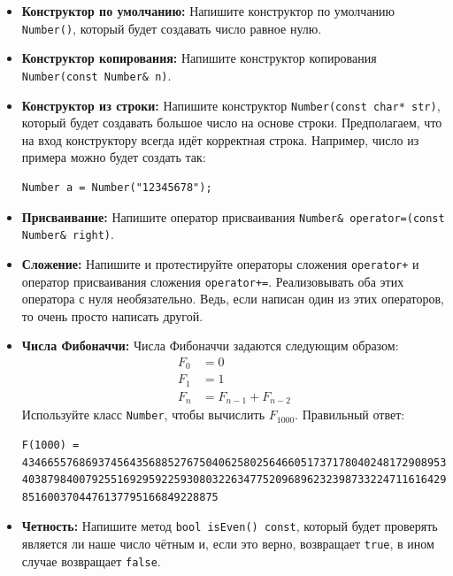 \documentclass{article}
\begin{document}
\begin{itemize}
\item \textbf{Конструктор по умолчанию:} Напишите конструктор по умолчанию \texttt{Number()}, который будет создавать число равное нулю.
\item \textbf{Конструктор копирования:} Напишите конструктор копирования \texttt{Number(const Number\& n)}.
\item \textbf{Конструктор из строки:} Напишите конструктор \texttt{Number(const char* str)}, который будет создавать большое число на основе строки. Предполагаем, что на вход конструктору всегда идёт корректная строка. Например, число из примера можно будет создать так:
\begin{lstlisting}
Number a = Number("12345678");
\end{lstlisting}
\item \textbf{Присваивание:} Напишите оператор присваивания \texttt{Number\& operator=(const Number\& right)}.
\item \textbf{Сложение:} Напишите и протестируйте операторы сложения \texttt{operator+} и оператор присваивания сложения \texttt{operator+=}.  Реализовывать оба этих оператора с нуля необязательно. Ведь, если написан один из этих операторов, то очень просто написать другой.
\item \textbf{Числа Фибоначчи:} Числа Фибоначчи задаются следующим образом:
\begin{align*}
F_0 &= 0\\
F_1 &= 1\\
F_n &= F_{n-1} + F_{n-2}
\end{align*}
Используйте класс \texttt{Number}, чтобы вычислить $F_{1000}$. Правильный ответ:
\begin{verbatim}
F(1000) = 43466557686937456435688527675040625802564660517371780402481729089536555417949051890
40387984007925516929592259308032263477520968962323987332247116164299644090653318793829896964992
8516003704476137795166849228875
\end{verbatim}




\item \textbf{Четность:} Напишите метод \texttt{bool isEven() const}, который будет проверять является ли наше число чётным и, если это верно, возвращает \texttt{true}, в ином случае возвращает \texttt{false}.


\end{itemize}
\end{document}
